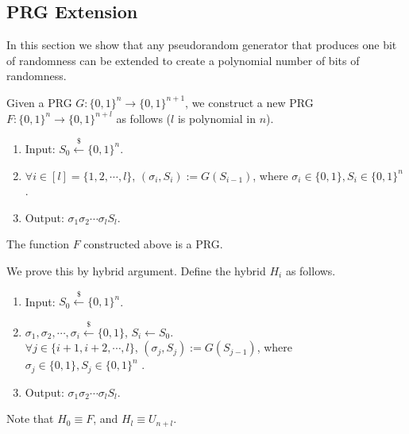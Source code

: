 
\subsection{PRG Extension}
In this section we show that any pseudorandom generator that produces one bit of randomness can be extended to create a polynomial number of bits of randomness.

\begin{construction}
Given a PRG $G: \{0, 1\}^n \rightarrow \{0, 1\} ^ {n+1}$,
we construct a new PRG $F: \{0, 1\}^n \rightarrow \{0, 1\} ^{n+l}$ as follows ($l$ is polynomial in $n$).
\begin{enumerate}[label=(\alph*)]
    \item Input: $S_0 \xleftarrow{\$} \{0, 1\}^n$.
    \item $\forall i \in [l] = \{1, 2, \cdots, l\}$, $(\sigma_i, S_i) := G(S_{i-1})$, where $\sigma_i \in \{0, 1\}, S_i \in \{0, 1\}^n$ .
    \item Output: $\sigma_1 \sigma_2 \cdots \sigma_l S_l$.
\end{enumerate}
\end{construction}

\begin{theorem}
The function $F$ constructed above is a PRG.
\end{theorem}

\proof
We prove this by hybrid argument. Define the hybrid $H_i$ as follows.
\begin{enumerate}[label=(\alph*)]
	\item Input: $S_0 \xleftarrow{\$} \{0, 1\}^n$.
    \item $\sigma_1, \sigma_2, \cdots, \sigma_i \xleftarrow{\$} \{0, 1\}$, $S_i \gets S_0$.\\
     $\forall j \in \{i+1, i+2, \cdots, l\}$, $(\sigma_j, S_j) := G(S_{j-1})$, where $\sigma_j \in \{0, 1\}, S_j \in \{0, 1\}^n$ .
    \item Output: $\sigma_1 \sigma_2 \cdots \sigma_l S_l$.
\end{enumerate}
Note that $H_0 \equiv F$, and $H_l \equiv U_{n+l}$.

